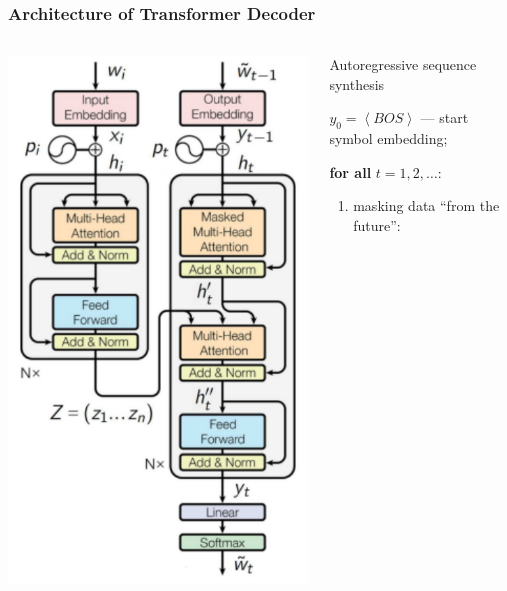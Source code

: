 \documentclass[fullscreen=true, bookmarks=true, hyperref={pdfencoding=unicode}]{beamer}
\begin{document}
\begin{frame}
  \frametitle{Architecture of Transformer Decoder}

    \begin{columns}
      \begin{column}{.28\paperwidth}
        \includegraphics[keepaspectratio,
                         width=.28\paperwidth]{transformer_decoder.png}
      \end{column}
      \begin{column}{.68\paperwidth}
      Autoregressive sequence synthesis

      $y_0 = \left< BOS \right>$ — start symbol embedding;

      \textbf{for all} $t = 1,2,\dots$:
        \begin{enumerate}
          \item masking data ``from the future'':


\end{enumerate}
\end{column}
\end{columns}
\end{frame}
\end{document}
